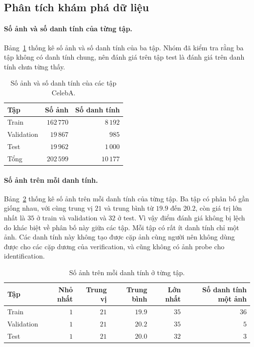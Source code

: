 \documentclass[a4paper,12pt]{article}
\begin{document}
\subsection{Phân tích khám phá dữ liệu}\label{sec:eda}

\paragraph{Số ảnh và số danh tính của từng tập.} Bảng~\ref{tab:celeba-split} thống kê số ảnh và số danh tính của ba tập. Nhóm đã kiểm tra rằng ba tập không có danh tính chung, nên đánh giá trên tập test là đánh giá trên danh tính chưa từng thấy.

\begin{table}[ht]
    \centering
    \caption{Số ảnh và số danh tính của các tập CelebA.}
    \label{tab:celeba-split}
    \begin{tabular}{lrr}
        \toprule
        Tập        & Số ảnh     & Số danh tính \\
        \midrule
        Train      & $162\,770$ & $8\,192$     \\
        Validation & $19\,867$  & $985$        \\
        Test       & $19\,962$  & $1\,000$     \\
        \midrule
        Tổng       & $202\,599$ & $10\,177$    \\
        \bottomrule
    \end{tabular}
\end{table}

\paragraph{Số ảnh trên mỗi danh tính.} Bảng~\ref{tab:ipi} thống kê số ảnh trên mỗi danh tính của từng tập. Ba tập có phân bố gần giống nhau, với cùng trung vị $21$ và trung bình từ $19.9$ đến $20.2$, còn giá trị lớn nhất là $35$ ở train và validation và $32$ ở test. Vì vậy điểm đánh giá không bị lệch do khác biệt về phân bố này giữa các tập. Mỗi tập có rất ít danh tính chỉ một ảnh. Các danh tính này không tạo được cặp ảnh cùng người nên không dùng được cho các cặp dương của verification, và cũng không có ảnh probe cho identification.

\begin{table}[ht]
    \centering
    \caption{Số ảnh trên mỗi danh tính ở từng tập.}
    \label{tab:ipi}
    \begin{tabular}{lrrrrr}
        \toprule
        Tập        & Nhỏ nhất & Trung vị & Trung bình & Lớn nhất & Số danh tính một ảnh \\
        \midrule
        Train      & $1$      & $21$     & $19.9$     & $35$     & $36$                 \\
        Validation & $1$      & $21$     & $20.2$     & $35$     & $5$                  \\
        Test       & $1$      & $21$     & $20.0$     & $32$     & $3$                  \\
        \bottomrule
    \end{tabular}
\end{table}
\end{document}
